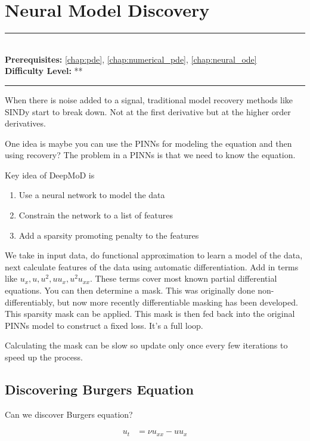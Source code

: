 \documentclass[book.tex]{subfiles}
\begin{document}
\chapter{Neural Model Discovery}
\label{chap:neural_cde}
\noindent\rule{11cm}{0.4pt} \\
\textbf{Prerequisites:}  \autoref{chap:pde}, \autoref{chap:numerical_pde}, \autoref{chap:neural_ode}  \\
\textbf{Difficulty Level:} ** \\
\noindent\rule{11cm}{0.4pt}
\vspace{5mm}

When there is noise added to a signal, traditional model recovery methods like SINDy start to break down. Not at the first derivative but at the higher order derivatives.

One idea is maybe you can use the PINNs for modeling the equation and then using recovery? The problem in a PINNs is that we need to know the equation.

Key idea of DeepMoD is
\begin{enumerate}
\item Use a neural network to model the data
\item Constrain the network to a list of features
\item Add a sparsity promoting penalty to the features
\end{enumerate}

We take in input data, do functional approximation to learn a model of the data, next calculate features of the data using automatic differentiation. Add in terms like $u_x, u, u^2, u u_x, u^2 u_{xx}$. These terms cover most known partial differential equations. You can then determine a mask. This was originally done non-differentiably, but now more recently differentiable masking has been developed. This sparsity mask can be applied. This mask is then fed back into the original PINNs model to construct a fixed loss. It's a full loop.

Calculating the mask can be slow so update only once every few iterations to speed up the process.

\section{Discovering Burgers Equation}

Can we discover Burgers equation?

\begin{align}
u_t &= \nu u_{xx} - u u_x
\end{align}
\end{document}
